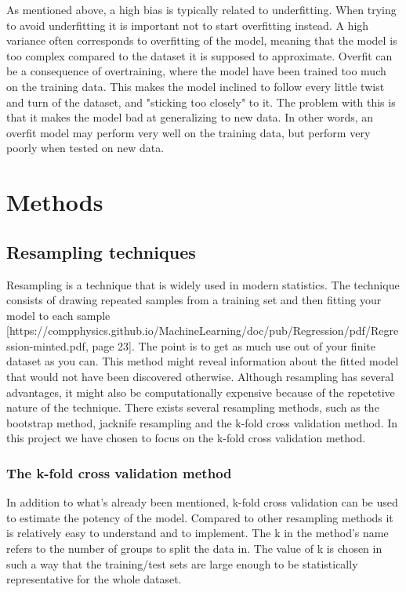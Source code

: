 \documentclass[a4paper,12pt]{article}
\begin{document}
As mentioned above, a high bias is typically related to underfitting. When trying to avoid underfitting it is important not to start overfitting instead.
A high variance often corresponds to overfitting of the model, meaning that the model is too complex compared to the dataset it is supposed to approximate. Overfit can be a consequence of overtraining, where the model have been trained too much on the training data. This makes the model inclined to follow every little twist and turn of the dataset, and "sticking too closely" to it. The problem with this is that it makes the model bad at generalizing to new data. In other words, an overfit model may perform very well on the training data, but perform very poorly when tested on new data.

\section{Methods}
\subsection{Resampling techniques}
Resampling is a technique that is widely used in modern statistics. The technique consists of drawing repeated samples from a training set and then fitting your model to each sample [https://compphysics.github.io/MachineLearning/doc/pub/Regression/pdf/Regression-minted.pdf, page 23]. The point is to get as much use out of your finite dataset as you can. This method might reveal information about the fitted model that would not have been discovered otherwise.\newline
Although resampling has several advantages, it might also be computationally expensive because of the repetetive nature of the technique.
There exists several resampling methods, such as the bootstrap method, jacknife resampling and the k-fold cross validation method. In this project we have chosen to focus on the k-fold cross validation method.

\subsubsection{The k-fold cross validation method}
In addition to what's already been mentioned, k-fold cross validation can be used to estimate the potency of the model. Compared to other resampling methods it is relatively easy to understand and to implement. The k in the method's name refers to the number of groups to split the data in. The value of k is chosen in such a way that the training/test sets are large enough to be statistically representative for the whole dataset.\newline
\end{document}
